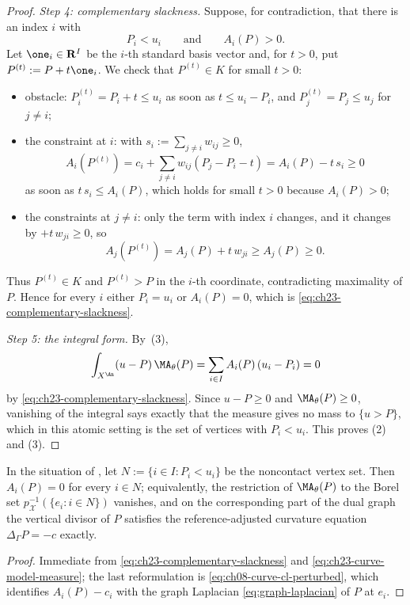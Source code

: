 \begin{proof}
\emph{Step 4: complementary slackness.}  Suppose, for contradiction, that
there is an index \(i\) with
\[
 P_i<u_i\qquad\text{and}\qquad A_i(P)>0 .
\]
Let \(\one_i\in\mathbf R^I\) be the \(i\)-th standard basis vector and, for
\(t>0\), put \(P^{(t)}:=P+t\one_i\).  We check that \(P^{(t)}\in K\) for
small \(t>0\):
\begin{itemize}
\item obstacle: \(P^{(t)}_i=P_i+t\leq u_i\) as soon as
\(t\leq u_i-P_i\), and \(P^{(t)}_j=P_j\leq u_j\) for \(j\ne i\);
\item the constraint at \(i\): with
\(s_i:=\sum_{j\ne i}w_{ij}\geq0\),
\[
 A_i(P^{(t)})=c_i+\sum_{j\ne i}w_{ij}(P_j-P_i-t)=A_i(P)-t\,s_i\geq0
\]
as soon as \(t\,s_i\leq A_i(P)\), which holds for small \(t>0\) because
\(A_i(P)>0\);
\item the constraints at \(j\ne i\): only the term with index \(i\) changes,
and it changes by \(+t\,w_{ji}\geq0\), so
\[
 A_j(P^{(t)})=A_j(P)+t\,w_{ji}\geq A_j(P)\geq0 .
\]
\end{itemize}
Thus \(P^{(t)}\in K\) and \(P^{(t)}>P\) in the \(i\)-th coordinate,
contradicting maximality of \(P\).  Hence for every \(i\) either
\(P_i=u_i\) or \(A_i(P)=0\), which is
\eqref{eq:ch23-complementary-slackness}.

\emph{Step 5: the integral form.}  By
\,(3),
\[
 \int_{X^{\An}}(u-P)\,\MA_\theta(P)
 =\sum_{i\in I}A_i(P)\,(u_i-P_i)=0
\]
by \eqref{eq:ch23-complementary-slackness}.  Since \(u-P\geq0\) and
\(\MA_\theta(P)\geq0\), vanishing of the integral says exactly that the
measure gives no mass to \(\{u>P\}\), which in this atomic setting is the
set of vertices with \(P_i<u_i\).  This proves (2) and (3).
\end{proof}

\begin{corollary}
\label{cor:ch23-curve-harmonic-off-contact}
In the situation of , let
\(N:=\{i\in I: P_i<u_i\}\) be the noncontact vertex set.  Then
\(A_i(P)=0\) for every \(i\in N\); equivalently, the restriction of
\(\MA_\theta(P)\) to the Borel set \(p_{\mathcal X}^{-1}(\{e_i:i\in N\})\)
vanishes, and on the corresponding part of the dual graph the vertical
divisor of \(P\) satisfies the reference-adjusted curvature equation
\(\Delta_\Gamma P=-c\) exactly.
\end{corollary}

\begin{proof}
Immediate from \eqref{eq:ch23-complementary-slackness} and
\eqref{eq:ch23-curve-model-measure}; the last reformulation is
\eqref{eq:ch08-curve-cl-perturbed}, which identifies \(A_i(P)-c_i\) with
the graph Laplacian \eqref{eq:graph-laplacian} of \(P\) at \(e_i\).
\end{proof}

